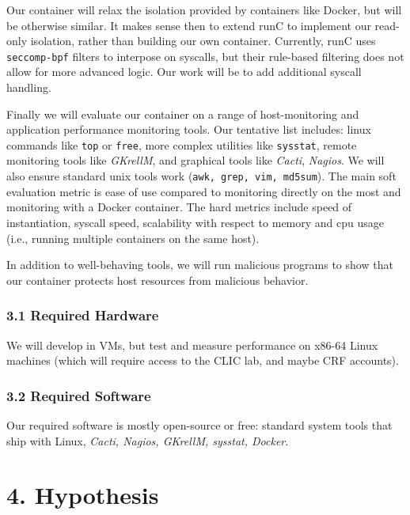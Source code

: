 \documentclass{proc}
\begin{document}
Our container will relax the isolation provided by containers like Docker, but will be otherwise similar. It makes sense then to extend runC to implement our read-only isolation, rather than building our own container. Currently, runC uses \texttt{seccomp-bpf} filters to interpose on syscalls, but their rule-based filtering does not allow for more advanced logic. Our work will be to add additional syscall handling.

Finally we will evaluate our container on a range of host-monitoring and application performance monitoring tools. Our tentative list includes: linux commands like \texttt{top} or \texttt{free}, more complex utilities like \texttt{sysstat}, remote monitoring tools like \emph{GKrellM}, and graphical tools like \emph{Cacti}, \emph{Nagios}. We will also ensure standard unix tools work (\texttt{awk, grep, vim, md5sum}). The main soft evaluation metric is ease of use compared to monitoring directly on the most and monitoring with a Docker container. The hard metrics include speed of instantiation, syscall speed, scalability with respect to memory and cpu usage (i.e., running multiple containers on the same host). 

In addition to well-behaving tools, we will run malicious programs to show that our container protects host resources from malicious behavior.

\subsubsection*{3.1 Required Hardware}
We will develop in VMs, but test and measure performance on x86-64 Linux machines (which will require access to the CLIC lab, and maybe CRF accounts).

\subsubsection*{3.2 Required Software}
Our required software is mostly open-source or free: standard system tools that ship with Linux, \emph{Cacti, Nagios, GKrellM, sysstat, Docker}.

\section*{4. Hypothesis}
\end{document}
